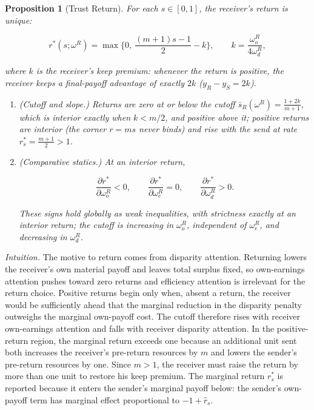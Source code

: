\documentclass[11pt]{article}
\theoremstyle{plain}
\newtheorem{proposition}{Proposition}
\theoremstyle{remark}
\begin{document}
\begin{proposition}[Trust Return]
\label{prop:trust_return}
For each $s\in[0,1]$, the receiver's return is unique:
\begin{csbox}
\[
        r^\ast(s;\omega^R)
        =
        \max\Big\{0,\ \frac{(m+1)s-1}{2}-k\Big\},
        \qquad
        k=\frac{\omega_o^R}{4\omega_d^R},
\]
\end{csbox}
where $k$ is the receiver's \emph{keep premium}: whenever the return is positive, the receiver keeps a final-payoff advantage of exactly $2k$ ($y_R-y_S=2k$).
\begin{enumerate}[topsep=2pt,itemsep=2pt]
\item \emph{(Cutoff and slope.)}  Returns are zero at or below the cutoff $\bar s_R(\omega^R)=\frac{1+2k}{m+1}$, which is interior exactly when $k<m/2$, and positive above it; positive returns are interior (the corner $r=ms$ never binds) and rise with the send at rate $r_s^\ast=\frac{m+1}2>1$.
\item \emph{(Comparative statics.)}  At an interior return,
\begin{csbox}
\[
        \frac{\partial r^\ast}{\partial \omega_o^R}<0,
        \qquad
        \frac{\partial r^\ast}{\partial \omega_e^R}=0,
        \qquad
        \frac{\partial r^\ast}{\partial \omega_d^R}>0.
\]
\end{csbox}
These signs hold globally as weak inequalities, with strictness exactly at an interior return; the cutoff is increasing in $\omega_o^R$, independent of $\omega_e^R$, and decreasing in $\omega_d^R$.
\end{enumerate}
\end{proposition}

\noindent\emph{Intuition.}  The motive to return comes from disparity attention.  Returning lowers the receiver's own material payoff and leaves total surplus fixed, so own-earnings attention pushes toward zero returns and efficiency attention is irrelevant for the return choice.  Positive returns begin only when, absent a return, the receiver would be sufficiently ahead that the marginal reduction in the disparity penalty outweighs the marginal own-payoff cost.  The cutoff therefore rises with receiver own-earnings attention and falls with receiver disparity attention.  In the positive-return region, the marginal return exceeds one because an additional unit sent both increases the receiver's pre-return resources by $m$ and lowers the sender's pre-return resources by one.  Since $m>1$, the receiver must raise the return by more than one unit to restore his keep premium.  The marginal return $r_s^\ast$ is reported because it enters the sender's marginal payoff below: the sender's own-payoff term has marginal effect proportional to $-1+\hat r_s$.
\end{document}
